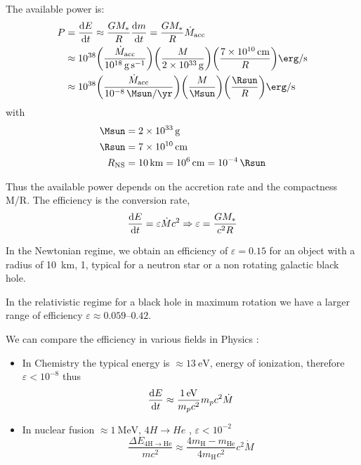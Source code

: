 \documentclass[10pt,a4paper,english]{article}
\let\originalleft\left
\let\originalright\right
\renewcommand{\left}{\mathopen{}\mathclose\bgroup\originalleft}
\renewcommand{\right}{\aftergroup\egroup\originalright}
\begin{document}
The available power is:
\begin{align*}
    P & = \frac{\d{E}}{\d{t}} \approx \frac{GM_*}{R} \frac{\d{m}}{\d{t}} = \frac{GM_*}{R} \dot{M}_\mathrm{acc} \\
      & \approx \num{e38} \left(\frac{\dot{M}_\mathrm{acc}}{\SI{e18}{\g\per\s}}\right) \left(\frac{M}{\SI{2e33}{\g}}\right) \left(\frac{\SI{7e10}{\cm}}{R}\right) \si{\erg\per\s} \\
      & \approx \num{e38} \left(\frac{\dot{M}_\mathrm{acc}}{\SI{e-8}{\Msun\per\yr}}\right) \left(\frac{M}{\si{\Msun}}\right) \left(\frac{\si{\Rsun}}{R}\right) \si{\erg\per\s}
\end{align*}
with
\begin{align*}
    \si{\Msun} &= \SI{2e33}{\g} \\
    \si{\Rsun} &= \SI{7e10}{\cm} \\
    R_\mathrm{NS}   &= \SI{10}{\km} = \SI{e6}{\cm} = \SI{e-4}{\Rsun}
\end{align*}

Thus the available power depends on the accretion rate and the compactness M/R.
The efficiency is the conversion rate,
\begin{equation*}
    \frac{\mathrm{d}{E}}{\mathrm{d}{t}} = \varepsilon \dot{M} c^{2} \Rightarrow \varepsilon = \frac{GM_*}{c^{2}R}
\end{equation*}

In the Newtonian regime, we obtain an efficiency of $\varepsilon = 0.15$ for an
object with a radius of \SI{10}{km}, \SI{1}{\Msun}, typical for a neutron star
or a non rotating galactic black hole.

In the relativistic regime for a black hole in maximum rotation we have a
larger range of efficiency $\varepsilon \approx \numrange{0.059}{0.42}$.

We can compare the efficiency in various fields in Physics :
\begin{itemize}
    \item In Chemistry the typical energy is $\approx \SI{13}{\electronvolt}$,
          energy of ionization, therefore $\varepsilon < 10^{-8}$ thus
          \begin{equation*}
              \frac{\mathrm{d}{E}}{\mathrm{d}{t}} \approx \frac{\SI{1}{\electronvolt}}{m_p c^2} m_p c^2 \dot{M}
          \end{equation*}
    \item In nuclear fusion $\approx \SI{1}{\mega\electronvolt}$, $4H \rightarrow He$ , $\varepsilon < 10^{-2}$
          \begin{equation*}
              \frac{\Delta E_{4 \mathrm{H} \rightarrow \mathrm{He}}}{m c^2} \approx \frac{4 m_\mathrm{H} - m_\mathrm{He}}{4 m_\mathrm{H} c^2} c^2 \dot{M}
          \end{equation*}
\end{itemize}
\end{document}
